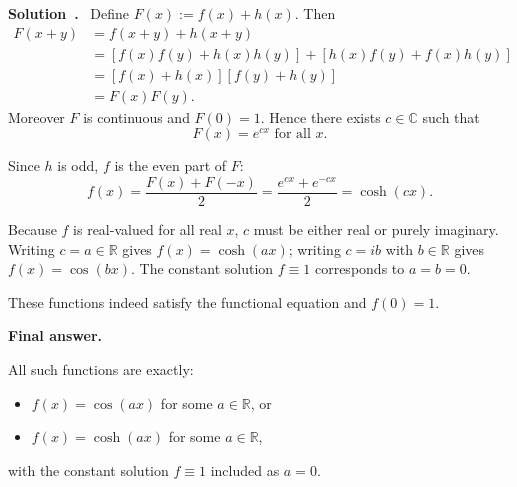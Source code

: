 \documentclass[a4paper,12pt]{article}
\newenvironment{solution}[1][]{%
  \goodbreak\smallskip\par\noindent\textbf{Solution\if\relax\detokenize{#1}\relax\else~#1\fi.}~}%
{%
  \goodbreak
}
\begin{document}
\begin{solution}
    Define $F(x) := f(x)+h(x)$. Then
    \begin{align*}
        F(x+y) &= f(x+y)+h(x+y)\\
        &= [f(x)f(y)+h(x)h(y)] + [h(x)f(y)+f(x)h(y)]\\
        &= [f(x)+h(x)][f(y)+h(y)]\\
        &= F(x)F(y).
    \end{align*}
    Moreover $F$ is continuous and $F(0)=1$. Hence there exists $c\in\mathbb{C}$ such that
    \[F(x) = e^{cx} \text{ for all } x.\]

    Since $h$ is odd, $f$ is the even part of $F$:
    \[f(x) = \frac{F(x)+F(-x)}{2} = \frac{e^{cx}+e^{-cx}}{2} = \cosh(cx).\]

    Because $f$ is real-valued for all real $x$, $c$ must be either real or purely imaginary. Writing $c=a\in\mathbb{R}$ gives $f(x)=\cosh(ax)$; writing $c=ib$ with $b\in\mathbb{R}$ gives $f(x)=\cos(bx)$. The constant solution $f\equiv 1$ corresponds to $a=b=0$.

    These functions indeed satisfy the functional equation and $f(0)=1$.

    \textbf{Final answer.}

    All such functions are exactly:
    \begin{itemize}
        \item $f(x)=\cos(ax)$ for some $a\in\mathbb{R}$, or
        \item $f(x)=\cosh(ax)$ for some $a\in\mathbb{R}$,
    \end{itemize}
    with the constant solution $f\equiv 1$ included as $a=0$.

\end{solution}

\end{document}
